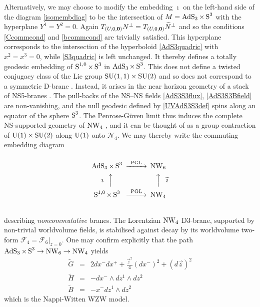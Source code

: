 Alternatively, we may choose to modify the embedding $\imath$ on the left-hand
side of the diagram \eqref{isomembdiag} to be the intersection of
$M=\AdS_3\times\S^3$ with the hyperplane $Y^1=Y^2=0$. Again
$T_{(U,0,\mbf0)}N^\perp = T_{(U,0,\mbf0)}\widetilde{N}^{\perp}$ and so the
conditions \eqref{Ccommcond} and \eqref{bcommcond} are trivially satisfied. This
hyperplane corresponds to the intersection of the hyperboloid
\eqref{AdS3quadric} with $x^2=x^3=0$, while \eqref{S3quadric} is left unchanged.
It thereby defines a totally geodesic embedding of $\S^{1,0}\times\S^3$ in
$\AdS_3\times\S^3$. This does not define a twisted conjugacy class of the Lie
group ${\rm SU}(1,1)\times{\rm SU}(2)$ and so does not correspond to a symmetric
D-brane \cite{BP1}. Instead, it arises in the near horizon geometry of a stack
of NS5-branes \cite{GO1}. The pull-backs of the NS--NS fields
\eqref{AdS3S3flux}, \eqref{AdS3S3Bfield} are non-vanishing, and the null
geodesic defined by \eqref{UVAdS3S3def} spins along an equator of the sphere
$\S^3$. The Penrose-G\"uven limit thus induces the complete NS-supported
geometry of $\NW_4$ \cite{DAK1}, and it can be thought of as a group contraction
of ${\rm U}(1)\times{\rm SU}(2)$ along ${\rm U}(1)$ onto $\mathcal{N}_4$. We may
thereby write the commuting embedding diagram
\begin{equation}
  \label{NW4commdiag}
  \begin{CD}
   @.\\
    \AdS_3 \times \S^3             @>\text{PGL}>> \NW_6\\
    \text{$\imath~~$}@AAA @AAA\text{$\widetilde{\imath}$}\\
    \S^{1,0}\times\S^3         @>\text{PGL}>> \NW_4\\
   @.
  \end{CD}
\end{equation}
describing {\it noncommutative} branes. The Lorentzian $\NW_4$ D3-brane,
supported by non-trivial worldvolume fields, is stabilised against decay by its
worldvolume two-form $\mathcal{F}_4=\mathcal{F}_6|_{z=0}$. One may confirm
explicitly that the path $\AdS_3\times\S^3\rightarrow\NW_6\rightarrow\NW_4$
yields
\begin{eqnarray}
  \label{eq:bpg:ex:jose:path1:G}
  \widetilde{G}&=&2dx^-dx^+ +\frac{\vec{z}^2}{4}\left(d
    x^-\right)^2 + \left(d\vec{z}\right)^2 \\
  \label{eq:bpg:ex:jose:path1:H}
  \widetilde{H}&=&-dx^-\wedge dz^1\wedge dz^2 \\
  \label{eq:bpg:ex:jose:path1:B}
  \widetilde{B}&=&-x^- dz^1\wedge dz^2
\end{eqnarray}
which is the Nappi-Witten WZW model.

